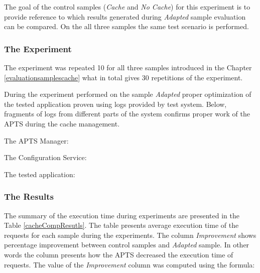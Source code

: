 \documentclass[10pt,a4paper]{article}
\begin{document}
The goal of the control samples (\textit{Cache} and \textit{No Cache}) for this experiment is to provide reference to which results generated during \textit{Adapted} sample evaluation can be compared. On the all three samples the same test scenario is performed. 



\subsubsection{The Experiment} 

The experiment was repeated 10 for all three samples introduced in the Chapter \ref{evaluationsamplescache} what in total gives 30 repetitions of the experiment.

During the experiment performed on the sample \textit{Adapted} proper optimization of the tested application proven using logs provided by test system. Below, fragments of logs from different parts of the system confirms proper work of the APTS during the cache management. 

The APTS Manager:

\noindent{}\vspace{1mm}

The Configuration Service:

\vspace{1mm}\noindent{}\vspace{1mm}

The tested application:

\vspace{1mm}\noindent{}\vspace{1mm}
 

\subsubsection{The Results} 

The summary of the execution time during experiments are presented in the Table \ref{cacheCompResutls}. The table presents average execution time of the requests for each sample during the experiments. The column \textit{Improvement} shows percentage improvement between control samples and \textit{Adapted} sample. In other words the column presents how the APTS decreased the execution time of requests. The value of the \textit{Improvement} column was computed using the formula: 
\end{document}
